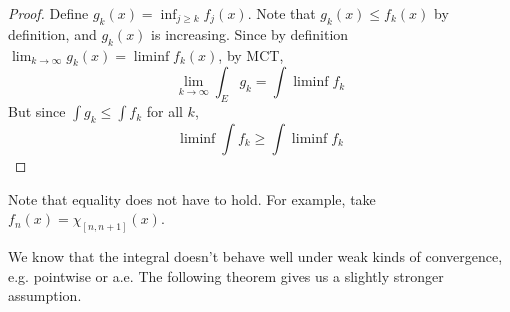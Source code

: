   \begin{proof}
    Define $g_k (x) = \inf_{j \geq k} f_j (x)$. Note that $g_k (x) \leq f_k (x)$ by definition, and $g_k (x)$ is increasing. Since by definition $\lim_{k \to \infty} g_k (x) = \liminf f_k (x)$, by MCT, 
    \begin{equation}
      \lim_{k \to \infty} \int_E g_k = \int \liminf f_k 
    \end{equation}
    But since $\int g_k \leq \int f_k$ for all $k$, 
    \begin{equation}
      \liminf \int f_k \geq \int \liminf f_k 
    \end{equation}
  \end{proof}

  Note that equality does not have to hold. For example, take $f_n (x) = \chi_{[n, n+1]} (x)$. 


  We know that the integral doesn't behave well under weak kinds of convergence, e.g. pointwise or a.e. The following theorem gives us a slightly stronger assumption. 

